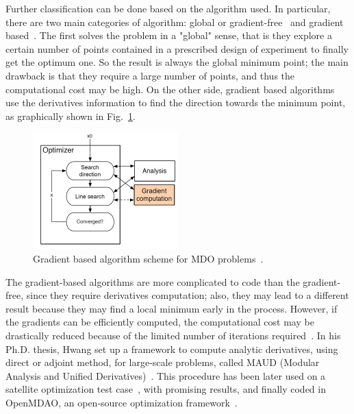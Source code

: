 Further classification can be done based on the algorithm used. 
In particular, there are two main categories of algorithm: global or gradient-free~\cite{bib:conn, bib:zadeh} and gradient based~\cite{bib:hwang_unif}. 
The first solves the problem in a "global" sense, that is they explore a certain number of points contained in a prescribed design of experiment to finally get the optimum one. 
So the result is always the global minimum point; the main drawback is that they require a large number of points, and thus the computational cost may be high. 
On the other side, gradient based algorithms use the derivatives information to find the direction towards the minimum point, as graphically shown in Fig.~\ref{fig:grad_based_scheme}. 
\begin{figure}[!h]
	\centering
	\includegraphics[keepaspectratio, width=0.5\textwidth]{images/app_mdo/grad_based_algo.jpg}
	\caption{Gradient based algorithm scheme for MDO problems~\cite{bib:martins_2014}.}
	\label{fig:grad_based_scheme}
\end{figure}
The gradient-based algorithms are more complicated to code than the gradient-free, since they require derivatives computation; also, they may lead to a different result because they may find a local minimum early in the process. 
However, if the gradients can be efficiently computed, the computational cost may be drastically reduced because of the limited number of iterations required~\cite{bib:zingg}. 
In his Ph.D. thesis, Hwang set up a framework to compute analytic derivatives, using direct or adjoint method, for large-scale problems, called MAUD (Modular Analysis and Unified Derivatives)~\cite{bib:hwang_omdao}. 
This procedure has been later used on a satellite optimization test case~\cite{bib:hwang_satellite}, with promising results, and finally coded in OpenMDAO, an open-source optimization framework~\cite{bib:gray_omdao}. 

